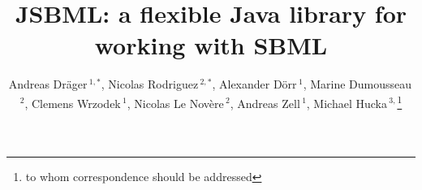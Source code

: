 \documentclass{bioinfo}
\begin{document}
\application
\title[JSBML: The Java library for SBML]{JSBML: a flexible Java library
for working with SBML} \author[Dr\"ager \textit{et~al.}]{Andreas
Dr\"ager\,$^{1,*}$, Nicolas Rodriguez\,$^{2,*}$, 
Alexander D\"orr\,$^{1}$, 
Marine Dumousseau\,$^{2}$,
Clemens Wrzodek\,$^{1}$, 
Nicolas Le Nov\`{e}re\,$^{2}$, 
Andreas Zell\,$^{1}$, 
Michael Hucka\,$^{3,}$\footnote{to whom correspondence should be addressed}}
\address{$^{1}$Center for Bioinformatics Tuebingen, University of Tuebingen, T\"ubingen, Germany.\\
$^{2}$European Bioinformatics Institute, Wellcome Trust Genome Campus, Hinxton, Cambridge, UK\\
$^{3}$Computing and Mathematical Sciences, California Institute of Technology, Pasadena, CA, USA}



\maketitle
\end{document}
